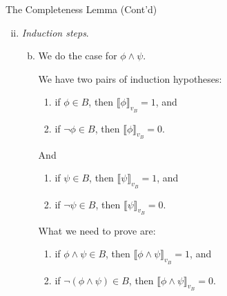 \documentclass[../slides.tex]{subfiles}
\begin{document}
\begin{frame}{The Completeness Lemma (Cont'd)}

\begin{enumerate}[(i)]
	
	\setcounter{enumi}{1}
	
	\item \emph{Induction steps}.
	
		\begin{enumerate}[(a)]
			\setcounter{enumii}{1}

				\item We do the case for $\phi\land \psi$.
				
				We have two pairs of induction hypotheses:
		\begin{enumerate}[1$_\phi$.]
	
		\item if $\phi\in B$, then $\llbracket\phi\rrbracket_{v_B}=1$, and 
		\item if $\neg \phi\in B$, then $\llbracket\phi\rrbracket_{v_B}=0$.
	
	\end{enumerate}
	
	And
	
	\begin{enumerate}[1$_\psi$.]
	
		\item if $\psi\in B$, then $\llbracket\psi\rrbracket_{v_B}=1$, and 
		\item if $\neg \psi\in B$, then $\llbracket\psi\rrbracket_{v_B}=0$.
	
	\end{enumerate}
	What we need to prove are:
	\begin{enumerate}
	
		\item if $\phi\land \psi\in B$, then $\llbracket\phi\land \psi\rrbracket_{v_B}=1$, and 
		\item if $\neg (\phi\land \psi)\in B$, then $\llbracket\phi\land \psi\rrbracket_{v_B}=0$.
	\end{enumerate}
		
	
		\end{enumerate}
	
	\end{enumerate}
	
\end{frame}
\end{document}
